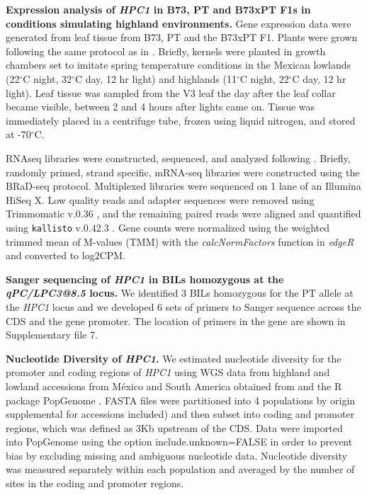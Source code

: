 \documentclass[9pt,twocolumn,twoside,lineno]{BioRxiv}
\begin{document}
\textbf{Expression analysis of \textit{HPC1} in B73, PT and B73xPT F1s in conditions simulating highland environments.}
Gene expression data were generated from leaf tissue from B73, PT and the B73xPT F1. 
Plants were grown following the same protocol as in \cite{Crow2020-gene}.
Briefly, kernels were planted in growth chambers set to imitate spring temperature conditions in the Mexican lowlands (22$^{\circ}$C night, 32$^{\circ}$C day, 12 hr light) and highlands (11$^{\circ}$C night, 22$^{\circ}$C day, 12 hr light). 
Leaf tissue was sampled from the V3 leaf the day after the leaf collar became visible, between 2 and 4 hours after lights came on. Tissue was immediately placed in a centrifuge tube, frozen using liquid nitrogen, and stored at -70$^{\circ}$C.

RNAseq libraries were constructed, sequenced, and analyzed following \cite{Crow2020-gene}. 
Briefly, randomly primed, strand specific, mRNA-seq libraries were constructed using the BRaD-seq \cite{townsley2015brad} protocol.
Multiplexed libraries were sequenced on 1 lane of an Illumina HiSeq X. 
Low quality reads and adapter sequences were removed using Trimmomatic v.0.36 \cite{bolger2014trimmomatic}, and the remaining paired reads were aligned and quantified using \texttt{kallisto} v.0.42.3 \cite{bray2016near}. 
Gene counts were normalized using the weighted trimmed mean of M-values (TMM) with the \textit{calcNormFactors} function in \textit{edgeR} \cite{robinson2010edger} and converted to log2CPM.

\textbf{Sanger sequencing of \textit{HPC1} in BILs homozygous at the \textit{qPC/LPC3@8.5} locus.}
We identified 3 BILs homozygous for the PT allele at the \textit{HPC1} locus and we developed 6 sets of primers to Sanger sequence across the CDS and the gene promoter. 
The location of primers in the gene are shown in Supplementary file 7. 

\textbf{Nucleotide Diversity of \textit{HPC1}.}
We estimated nucleotide diversity for the promoter and coding regions of \textit{HPC1} using WGS data from highland and lowland accessions from M\'exico and South America obtained from \cite{Wang2017-bc} and the R package PopGenome \cite{Pfeifer2014-bg}. %
FASTA files were partitioned into 4 populations by origin supplemental for accessions included) and then subset into coding and promoter regions, which was defined as 3Kb upstream of the CDS.  %
Data were imported into PopGenome using the option include.unknown=FALSE in order to prevent bias by excluding missing and ambiguous nucleotide data.
Nucleotide diversity was measured separately within each population and averaged by the number of sites in the coding and promoter regions.
\end{document}
